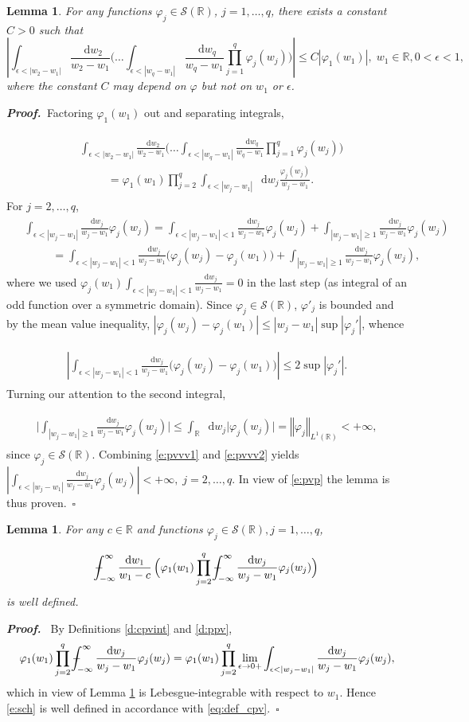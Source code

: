 \documentclass[11pt,A4,twoside]{article}
\numberwithin{equation}{section}
\renewcommand*\d{\mathop{}\!\mathrm{d}}
\newcommand{\norm}[1]{\left|#1 \right|}
\newcommand{\Norm}[1]{\left\Vert#1 \right\Vert}
\newcommand{\R}{\mathbbm{R}}
\renewcommand{\S}{\mathcal{S}}
\def\Phint#1{\mathchoice
  {\XXint\displaystyle\textstyle{#1}}%
  {\XXint\textstyle\scriptstyle{#1}}%
  {\XXint\scriptstyle\scriptscriptstyle{#1}}%
  {\XXint\scriptscriptstyle\scriptscriptstyle{#1}}%
  \!\int}
\def\XXint#1#2#3{{\setbox0=\hbox{$#1{#2#3}{\int}$}
    \vcenter{\hbox{$#2#3$}}\kern-.5\wd0}}
\def\dashint{\Phint-}
\def\qqq{\;\;\;\;\;\;\;\;\;}
\def\bel{\begin{eqnarray*}\begin{aligned}}
\def\eel{\end{aligned}\end{eqnarray*}}
\newcommand{\beqa}{\begin{eqnarray}}
\newcommand{\eeqa}{\end{eqnarray}}
\def\bal{\begin{aligned}}
\def\eal{\end{aligned}}
\def\bll#1{
\beqa\label{#1}\bal
}\def\lel{\eal\eeqa}
\newcommand{\beql}[1]{\bll{#1}}
\newcommand{\eeql}{\lel}
\newtheorem{lemma}[theorem]{Lemma}
\theoremstyle{definition}
\theoremstyle{remark}
\def\sp{,\;}
\def\R{\mathbb{R}}
\def\finproof {$\Box$ \vskip 5 pt }\def\finproof{\rule{4pt}{6pt}}\def\finproof{\ensuremath{\square}}
\def\proof{\noindent \emph{\textbf{Proof.} $\, $}}
\begin{document}
\begin{lemma}\label{l:pvcom} For any functions %
$\varphi_j \in \S(\R) $, $j =1,\dots,q$, there exists a constant $C > 0$ such that
\[
 \left| \int_{\epsilon<|w_2-w_1|}  \frac{\d w_2 }{w_2-w_1}  \Big( \dots \int_{\epsilon<|w_q-w_1|} \frac{\d w_q }{w_q-w_1}  \prod_{j = 1}^q \varphi_j(w_j)  \Big)  
\right| \leq C |\varphi_{1}(w_1)| \sp   w_1 \in\R , 0<\epsilon < 1,
\]
where the constant $C$ may depend on $\varphi$ but not on $w_1$ or $\epsilon$.
\end{lemma}
\proof Factoring $\varphi_1(w_1)$ out and separating integrals,
\beql{e:pvp}
&\int_{\epsilon<|w_2-w_1|}  \frac{\d w_2 }{w_2-w_1} \Big( \dots \int_{\epsilon<|w_q-w_1|} \frac{\d w_q }{w_q-w_1} \prod_{j = 1}^q \varphi_j(w_j) \Big)%
\\&\qqq
= \varphi_1(w_1) \prod_{j = 2}^q\int_{\epsilon<|w_j-w_1|} \d w_j \frac{\varphi_j(w_j)}{w_j-w_1} .  
\eeql
For $j = 2,\dots, q$,
\bel{}
 &\int_{\epsilon<|w_j-w_1|}  \frac{\d w_j}{w_j-w_1}\varphi_j(w_j) = \int_{\epsilon<|w_j-w_1|<1}  \frac{\d w_j}{w_j-w_1}\varphi_j(w_j)  + \int_{|w_j-w_1|\geq1} \frac{\d w_j}{w_j-w_1}\varphi_j(w_j)\\
 &\qqq=\int_{\epsilon<|w_j-w_1|<1}  \frac{\d w_j}{w_j-w_1} \big(\varphi_j(w_j) - \varphi_j(w_1)\big)  + \int_{|w_j-w_1|\geq1}  \frac{\d w_j}{w_j-w_1}\varphi_j(w_j),
\eel
where we used $ \varphi_j(w_1)\int_{\epsilon<|w_j-w_1|<1}  \frac{\d w_j}{w_j-w_1} = 0 $ in the last step (as integral of an odd function over a symmetric domain). Since $\varphi_j \in \S(\R)$, $\varphi'_j$ is bounded and by the mean value inequality, $\norm{ \varphi_j(w_j) - \varphi_j(w_1)} \leq |w_j - w_1|   \sup |\varphi_j'|$, whence 
\beql{e:pvvv1}
\left|\int_{\epsilon<|w_j-w_1|<1}  \frac{\d w_j}{w_j-w_1}\big(\varphi_j(w_j) - \varphi_j(w_1)\big)\right| \leq 2\sup\norm{\varphi_j'}.
\eeql
Turning our attention to the second integral,
\beql{e:pvvv2}
\Bigg|\int_{|w_j-w_1|\geq1}  \frac{\d w_j}{w_j-w_1}\varphi_j(w_j)\Bigg| \leq \int_{\R} \d w_j \big| \varphi_j(w_j)\big|=\Norm{\varphi_j}_{L^1(\R)}<+\infty, 
\eeql
since $\varphi_j\in \S(\R)$. Combining \eqref{e:pvvv1} and \eqref{e:pvvv2} yields
$
\left|\int_{\epsilon<|w_j-w_1|}  \frac{\d w_j}{w_j-w_1}\varphi_j(w_j) \right|< +\infty\sp j =2,\dots,q.
$
In view of \eqref{e:pvp} the lemma is thus proven.\ \finproof

\begin{lemma}\label{prop:pvcom} For any $c\in \R$ 
and functions $\varphi_j \in \S(\R), j=1,\dots,q$,
\beql{e:sch}  \dashint_{-\infty}^\infty \frac{\d w_1}{w_1 - c} \, \Big(\varphi_1(w_1)\prod_{j=2}^q\dashint_{-\infty}^\infty \frac{\d w_j}{w_j - w_1}\varphi_j(w_j)\Big)   
\eeql   
is well defined.
\end{lemma}
\proof
By Definitions \ref{d:cpvint} and \ref{d:ppv},   
\[
 \varphi_1(w_1)  \prod_{j=2}^q\dashint_{-\infty}^\infty \frac{\d w_j}{w_j - w_1} \varphi_j(w_j)
    =
    \varphi_1(w_1) \prod_{j=2}^q\lim_{\epsilon\to 0+}\int_{\epsilon<|w_j-w_1|} \frac{ \d w_j}{w_j-w_1} \varphi_j(w_j),
\]
which in view of Lemma \ref{l:pvcom} is Lebesgue-integrable with respect to $w_1$. Hence \eqref{e:sch} is well defined in accordance with \eqref{eq:def_cpv}.\ \finproof
\end{document}
